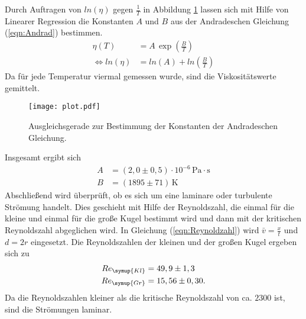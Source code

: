 Durch Auftragen von $ln(\eta)$ gegen $\frac{1}{T}$ in Abbildung \ref{fig:plot} lassen sich mit Hilfe von Linearer Regression die Konstanten $A$ und $B$
aus der Andradeschen Gleichung (\ref{eqn:Andrad}) bestimmen.
\begin{align*}
  \eta(T) &= A \, \exp{\left(\frac{B}{T}\right)} \\
  \iff ln(\eta) &= ln(A) + ln(\frac{B}{T})
\end{align*}
Da für jede Temperatur viermal gemessen wurde, sind die Viskositätswerte gemittelt.

\begin{figure}
  \centering
  \texttt{[image: plot.pdf]}
  \caption{Ausgleichsgerade zur Bestimmung der Konstanten der Andradeschen Gleichung.}
  \label{fig:plot}
\end{figure}

Insgesamt ergibt sich
\begin{align*}
  A &= (2,0 \pm 0,5)\cdot 10^{-6}\,\unit{\pascal}\cdot \unit{\second}\\
  B &= (1895 \pm 71)\,\unit{\kelvin}
\end{align*}
Abschließend wird überprüft, ob es sich um eine laminare oder turbulente Strömung handelt. Dies geschieht mit Hilfe der Reynoldszahl, die einmal für die kleine und
einmal für die große Kugel bestimmt wird und dann mit der kritischen Reynoldszahl abgeglichen wird. In Gleichung (\ref{eqn:Reynoldzahl}) wird $\bar{v} = \frac{x}{t}$
und $d = 2r$ eingesetzt. Die Reynoldszahlen der kleinen und der großen Kugel ergeben sich zu
\begin{align*}
  Re_{\symup{Kl}} &= 49,9 \pm 1,3\\
  Re_{\symup{Gr}} &= 15,56 \pm 0,30.
\end{align*}
Da die Reynoldszahlen kleiner als die kritische Reynoldszahl von ca. $2300$ \cite{kritreynold} ist, sind die Strömungen laminar.